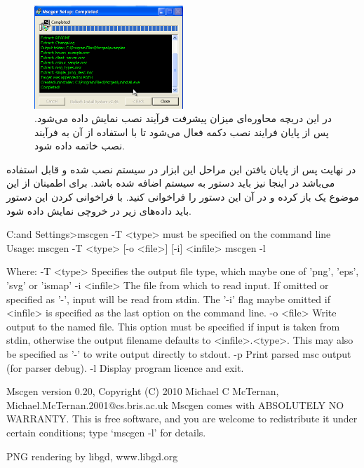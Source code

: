 \begin{figure}
	\centering
	\includegraphics[width=0.5\textwidth]{image/write/graph/mscgen/install-win-3}
	\caption[پیشرفت فرآیند نصب  در ویندوز]{
		در این دریچه محاوره‌ای میزان پیشرفت فرآیند نصب نمایش داده می‌شود. پس از پایان
		فرایند نصب دکمه  فعال می‌شود تا با استفاده از آن به فرآیند نصب خاتمه
		داده شود.
		}
	\label{image/write/graph/mscgen/install-win-3}
\end{figure}

در نهایت پس از پایان یافتن این مراحل این ابزار در سیستم نصب شده و قابل استفاده
می‌باشد در اینجا نیز باید دستور  به سیستم اضافه شده باشد. برای
اطمینان از این موضوع یک  باز کرده و در آن این دستور را فراخوانی کنید. با
فراخوانی کردن این دستور باید داده‌های زیر در خروچی نمایش داده شود.

\begin{Shell}
C:\Documents and Settings\malek>mscgen
-T <type> must be specified on the command line
Usage: mscgen -T <type> [-o <file>] [-i] <infile>
       mscgen -l

Where:
 -T <type>   Specifies the output file type, which maybe one of 'png', 'eps',
             'svg' or 'ismap'
 -i <infile> The file from which to read input.  If omitted or specified as
              '-', input will be read from stdin.  The '-i' flag maybe
              omitted if <infile> is specified as the last option on the
              command line.
 -o <file>   Write output to the named file.  This option must be specified if
              input is taken from stdin, otherwise the output filename
              defaults to <infile>.<type>.  This may also be specified as '-'
              to write output directly to stdout.
 -p          Print parsed msc output (for parser debug).
 -l          Display program licence and exit.

Mscgen version 0.20, Copyright (C) 2010 Michael C McTernan,
                                        Michael.McTernan.2001@cs.bris.ac.uk
Mscgen comes with ABSOLUTELY NO WARRANTY.  This is free software, and you are
welcome to redistribute it under certain conditions; type `mscgen -l' for
details.

PNG rendering by libgd, www.libgd.org
\end{Shell}


